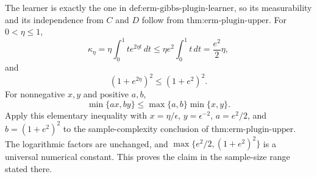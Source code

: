 The learner is exactly the one in \(\text{def:erm-gibbs-plugin-learner}\), so its measurability and its independence from \(C\) and \(D\) follow from \(\text{thm:erm-plugin-upper}\). For \(0<\eta\le1\),
\[
\kappa_\eta
=\eta\int_0^1 t e^{2\eta t}\,dt
\le \eta e^2\int_0^1t\,dt
=\frac{e^2}{2}\eta,
\]
and
\[
(1+e^{2\eta})^2\le(1+e^2)^2.
\]
For nonnegative \(x,y\) and positive \(a,b\),
\[
\min\{ax,by\}\le\max\{a,b\}\min\{x,y\}.
\]
Apply this elementary inequality with \(x=\eta/\epsilon\), \(y=\epsilon^{-2}\), \(a=e^2/2\), and \(b=(1+e^2)^2\) to the sample-complexity conclusion of \(\text{thm:erm-plugin-upper}\). The logarithmic factors are unchanged, and \(\max\{e^2/2,(1+e^2)^2\}\) is a universal numerical constant. This proves the claim in the sample-size range stated there.